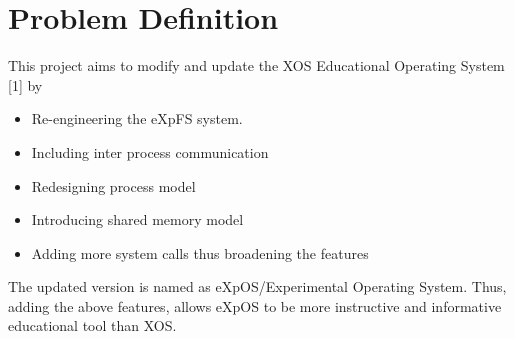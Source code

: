 \chapter{Problem Definition}
\label{chap1}
  This project aims to modify and update the XOS Educational Operating System [1]  by
\begin{itemize}
\item Re-engineering the eXpFS system. 
\item Including inter process communication
\item Redesigning process model 
\item Introducing shared memory model 
\item Adding more system calls thus broadening the features
\end {itemize}
The updated version is named as eXpOS/Experimental Operating System. 
Thus, adding the above features, allows eXpOS to be more instructive and informative educational tool than XOS.

